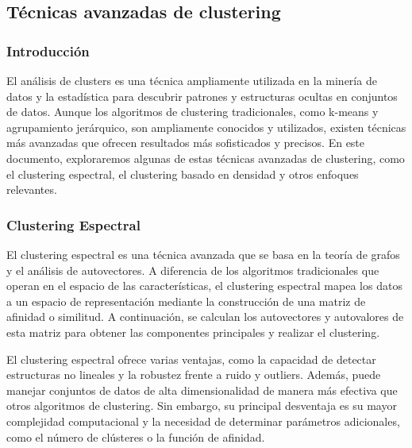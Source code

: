 \documentclass{article}
\begin{document}
\subsection{Técnicas avanzadas de clustering}

\subsubsection{Introducción}
El análisis de clusters es una técnica ampliamente utilizada en la minería de datos y la estadística para descubrir patrones y estructuras ocultas en conjuntos de datos. Aunque los algoritmos de clustering tradicionales, como k-means y agrupamiento jerárquico, son ampliamente conocidos y utilizados, existen técnicas más avanzadas que ofrecen resultados más sofisticados y precisos. En este documento, exploraremos algunas de estas técnicas avanzadas de clustering, como el clustering espectral, el clustering basado en densidad y otros enfoques relevantes.

\subsubsection{Clustering Espectral}
El clustering espectral es una técnica avanzada que se basa en la teoría de grafos y el análisis de autovectores. A diferencia de los algoritmos tradicionales que operan en el espacio de las características, el clustering espectral mapea los datos a un espacio de representación mediante la construcción de una matriz de afinidad o similitud. A continuación, se calculan los autovectores y autovalores de esta matriz para obtener las componentes principales y realizar el clustering.

El clustering espectral ofrece varias ventajas, como la capacidad de detectar estructuras no lineales y la robustez frente a ruido y outliers. Además, puede manejar conjuntos de datos de alta dimensionalidad de manera más efectiva que otros algoritmos de clustering. Sin embargo, su principal desventaja es su mayor complejidad computacional y la necesidad de determinar parámetros adicionales, como el número de clústeres o la función de afinidad.
\end{document}
